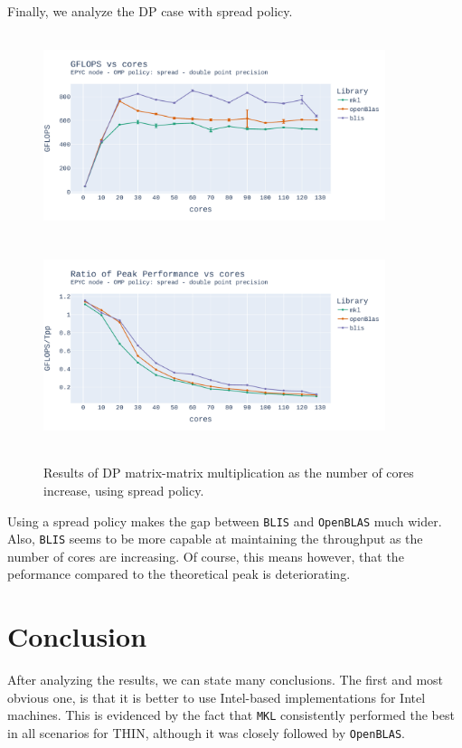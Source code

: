 \documentclass{report}
\begin{document}
Finally, we analyze the DP case with spread policy.

\begin{figure}[H]
\hspace*{-2.5cm}
\includegraphics[width=10cm, height=6cm]{./images/fixed_size_epyc_double_gflops_spread.pdf}
\includegraphics[width=10cm, height=6cm]{./images/fixed_size_epyc_double_gflops_spread_ratio.pdf}
\caption{\label{fig:fixed_size_epyc_double_spread} Results of DP matrix-matrix multiplication 
as the number of cores increase, using spread policy.}
\end{figure}

Using a spread policy makes the gap between \texttt{BLIS} and \texttt{OpenBLAS} much 
wider. Also, \texttt{BLIS} seems to be more capable at maintaining the throughput 
as the number of cores are increasing. Of course, this means however, that the 
peformance compared to the theoretical peak is deteriorating.

\section{Conclusion}

After analyzing the results, we can state many conclusions. The first and most 
obvious one, is that it is better to use Intel-based implementations for Intel 
machines. This is evidenced by the fact that \texttt{MKL} consistently performed
the best in all scenarios for THIN, although it was closely followed by 
\texttt{OpenBLAS}. 
\end{document}
